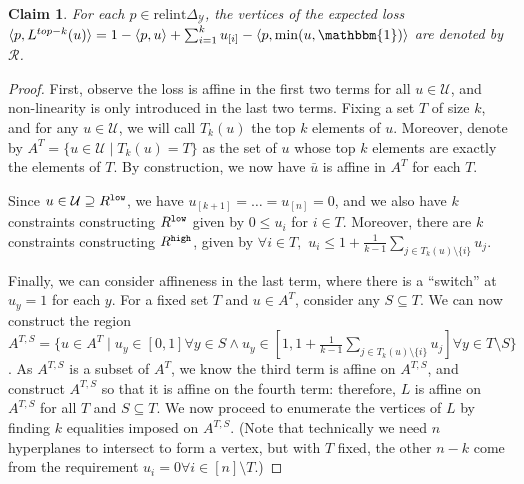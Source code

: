 \documentclass[12pt]{article}
\newcommand{\simplex}{\Delta_\Y}
\newcommand{\R}{\mathcal{R}}
\newcommand{\U}{\mathcal{U}}
\newcommand{\Y}{\mathcal{Y}}
\newcommand{\inprod}[2]{\langle #1, #2 \rangle}%
\newcommand{\ones}{\mathbbm{1}}
\newtheorem{claim}{Claim}
\begin{document}
\begin{claim}\label{claim:R-vertices}
	For each $p \in \mathrm{relint}\simplex$, the vertices of the expected loss $\inprod{p}{L^{top-k}(u)} = 1 - \inprod{p}{u} + \sum_{i=1}^k u_{[i]} - \inprod{p}{\min(u,\ones)}$ are denoted by $\R$.
\end{claim}
\begin{proof}
	First, observe the loss is affine in the first two terms for all $u \in \U$, and non-linearity is only introduced in the last two terms.
	Fixing a set $T$ of size $k$, and for any $u \in \U$, we will call $T_k(u)$ the top $k$ elements of $u$.
	Moreover, denote by $A^T = \{u \in \U \mid T_k(u) = T\}$ as the set of $u$ whose top $k$ elements are exactly the elements of $T$.
	By construction, we now have $\bar u$ is affine in $A^T$ for each $T$.
	 
	Since $u \in \U \supseteq R^{\tt low}$, we have $u_{[k+1]} = \ldots = u_{[n]} = 0$, and we also have $k$ constraints constructing $R^{\tt low}$ given by $0 \leq u_{i}$ for $i \in T$.	
	Moreover, there are $k$ constraints constructing $R^{\tt high}$, given by $\forall i \in T, \,\,
	u_{i} \leq 1 + \frac{1}{k-1}\sum_{j \in T_k(u) \setminus \{i\}} u_j$.


	Finally, we can consider affineness in the last term, where there is a ``switch'' at $u_y = 1$ for each $y$.
	For a fixed set $T$ and $u \in A^T$, consider any $S \subseteq T$.
	We can now construct the region $A^{T,S} = \{u \in A^T \mid u_y \in [0,1] \forall y \in S \wedge u_y \in [1,1 + \frac 1 {k-1} \sum_{j \in T_k(u) \setminus \{i\}} u_j] \forall y \in T \setminus S \}$.
	As $A^{T,S}$ is a subset of $A^T$, we know the third term is affine on $A^{T,S}$, and construct $A^{T,S}$ so that it is affine on the fourth term: therefore, $L$ is affine on $A^{T,S}$ for all $T$ and $S \subseteq T$. 
	We now proceed to enumerate the vertices of $L$ by finding $k$ equalities imposed on $A^{T,S}$.
	(Note that technically we need $n$ hyperplanes to intersect to form a vertex, but with $T$ fixed, the other $n-k$ come from the requirement $u_i = 0 \forall i \in [n] \setminus T$.)
	

\end{proof}
\end{document}
